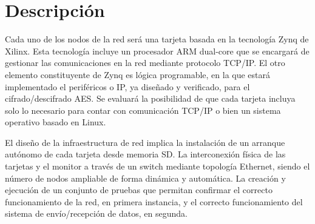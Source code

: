 \chapter{Descripción}
Cada uno de los nodos de la red será una tarjeta basada en la tecnología Zynq de Xilinx. Esta tecnología incluye un procesador ARM dual-core que se encargará de gestionar las
comunicaciones en la red mediante protocolo TCP/IP. El otro elemento constituyente de Zynq es lógica programable, en la que estará implementado el periféricos o IP, ya diseñado y
verificado, para el cifrado/descifrado AES. Se evaluará la posibilidad de que cada tarjeta incluya solo lo necesario para contar con comunicación TCP/IP o bien un sistema operativo
basado en Linux.

El diseño de la infraestructura de red implica la instalación de un arranque autónomo de cada tarjeta desde memoria SD. La interconexión física de las tarjetas y el monitor a través de
un switch mediante topología Ethernet, siendo el número de nodos ampliable de forma dinámica y automática. La creación y ejecución de un conjunto de pruebas que permitan confirmar
el correcto funcionamiento de la red, en primera instancia, y el correcto funcionamiento del sistema de envío/recepción de datos, en segunda.